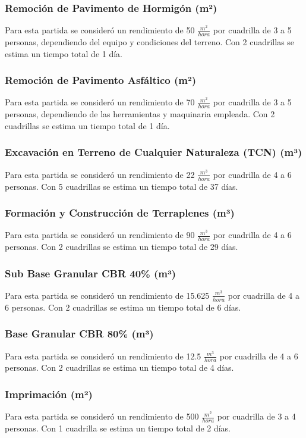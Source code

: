 \documentclass{article} %
\begin{document}
\subsubsection{Remoción de Pavimento de Hormigón (m²)}
Para esta partida se consideró un rendimiento de 50 $\frac{m^2}{hora}$ por cuadrilla de 3 a 5 personas, dependiendo del equipo y condiciones del terreno. Con 2 cuadrillas se estima un tiempo total de 1 día.

\subsubsection{Remoción de Pavimento Asfáltico (m²)}
Para esta partida se consideró un rendimiento de 70 $\frac{m^2}{hora}$ por cuadrilla de 3 a 5 personas, dependiendo de las herramientas y maquinaria empleada. Con 2 cuadrillas se estima un tiempo total de 1 día.

\subsubsection{Excavación en Terreno de Cualquier Naturaleza (TCN) (m³)}
Para esta partida se consideró un rendimiento de 22 $\frac{m^3}{hora}$ por cuadrilla de 4 a 6 personas. Con 5 cuadrillas se estima un tiempo total de 37 días.

\subsubsection{Formación y Construcción de Terraplenes (m³)}
Para esta partida se consideró un rendimiento de 90 $\frac{m^3}{hora}$ por cuadrilla de 4 a 6 personas. Con 2 cuadrillas se estima un tiempo total de 29 días.

\subsubsection{Sub Base Granular CBR 40\% (m³)}
Para esta partida se consideró un rendimiento de 15.625 $\frac{m^3}{hora}$ por cuadrilla de 4 a 6 personas. Con 2 cuadrillas se estima un tiempo total de 6 días.

\subsubsection{Base Granular CBR 80\% (m³)}
Para esta partida se consideró un rendimiento de 12.5 $\frac{m^3}{hora}$ por cuadrilla de 4 a 6 personas. Con 2 cuadrillas se estima un tiempo total de 4 días.

\subsubsection{Imprimación (m²)}
Para esta partida se consideró un rendimiento de 500 $\frac{m^2}{hora}$ por cuadrilla de 3 a 4 personas. Con 1 cuadrilla se estima un tiempo total de 2 días.
\end{document}
